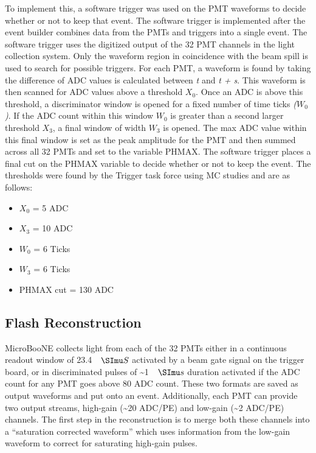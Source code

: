 To implement this, a software trigger was used on the PMT waveforms to decide whether or not to keep that event. The software trigger is implemented after the event builder combines data from the PMTs and triggers into a single event. The software trigger uses the digitized output of the 32 PMT channels in the light collection system. Only the waveform region in coincidence with the beam spill is used to search for possible triggers. For each PMT, a waveform is found by taking the difference of ADC values is calculated between \textit{t} and \textit{t + s}. This waveform is then scanned for ADC values above a threshold \textit{$X_0$}. Once an ADC is above this threshold, a discriminator window is opened for a fixed number of time ticks \textit{($W_0$)}. If the ADC count within this window \textit{$W_0$} is greater than a second larger threshold \textit{$X_3$}, a final window of width \textit{$W_3$} is opened. The max ADC value within this final window is set as the peak amplitude for the PMT and then summed across all 32 PMTs and set to the variable PHMAX. The software trigger places a final cut on the PHMAX variable to decide whether or not to keep the event. The thresholds were found by the Trigger task force using MC studies and are as follows: 
\begin{itemize}
\item{$X_0$ = 5 ADC} 
\item{$X_3$ = 10 ADC} 
\item{$W_0$ = 6 Ticks} 
\item{$W_3$ = 6 Ticks} 
\item{PHMAX cut = 130 ADC}
\end{itemize}

\subsection{Flash Reconstruction}
MicroBooNE collects light from each of the 32 PMTs either in a continuous readout window of 23.4 $\micro S$ activated by a beam gate signal on the trigger board, or in discriminated pulses of \sim 1 $\micro s$ duration activated if the ADC count for any PMT goes above 80 ADC count. These two formats are saved as output waveforms and put onto an event. Additionally, each PMT can provide two output streams, high-gain (\sim 20 ADC/PE) and low-gain (\sim 2 ADC/PE) channels. The first step in the reconstruction is to merge both these channels into a ``saturation corrected waveform'' which uses information from the low-gain waveform to correct for saturating high-gain pulses.
 
